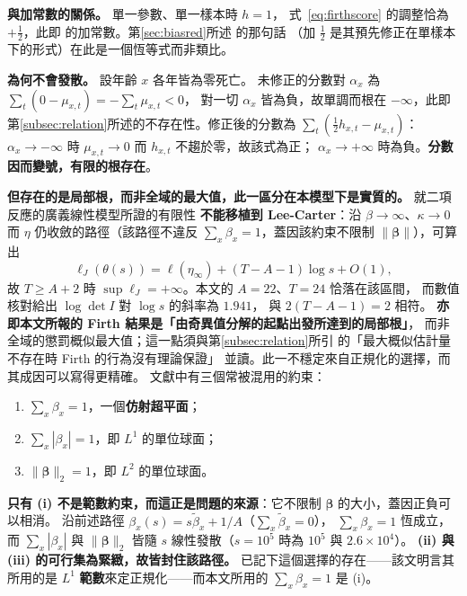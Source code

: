 \documentclass[UTF8, fontset=macnew, a4paper, 12pt]{ctexart}
\begin{document}
\textbf{與加常數的關係。} 單一參數、單一樣本時 $h=1$，
式~\eqref{eq:firthscore} 的調整恰為 $+\tfrac12$，此即 \citet{haldane1956}
的加常數。第\ref{sec:biasred}所述 \citet[\S3.3]{firth1993} 的那句話
（加 $\tfrac12$ 是其預先修正在單樣本下的形式）在此是一個恆等式而非類比。

\textbf{為何不會發散。} 設年齡 $x$ 各年皆為零死亡。
未修正的分數對 $\alpha_x$ 為 $\sum_t(0-\mu_{x,t})=-\sum_t\mu_{x,t}<0$，
對一切 $\alpha_x$ 皆為負，故單調而根在 $-\infty$，此即
第\ref{subsec:relation}所述的不存在性。修正後的分數為
$\sum_t(\tfrac12 h_{x,t}-\mu_{x,t})$：$\alpha_x\to-\infty$ 時
$\mu_{x,t}\to0$ 而 $h_{x,t}$ 不趨於零，故該式為正；
$\alpha_x\to+\infty$ 時為負。\textbf{分數因而變號，有限的根存在}。

\textbf{但存在的是局部根，而非全域的最大值，此一區分在本模型下是實質的。}
\citet{kosmidis2021} 就二項反應的廣義線性模型所證的有限性
\textbf{不能移植到 Lee-Carter}：沿 $\beta\to\infty$、$\kappa\to0$ 而
$\eta$ 仍收斂的路徑（該路徑不違反 $\sum_x\beta_x=1$，蓋因該約束不限制
$\|\boldsymbol\beta\|$），可算出
$$\ell_J(\theta(s))=\ell(\eta_\infty)+(T-A-1)\log s+O(1),$$
故 $T\ge A+2$ 時 $\sup\ell_J=+\infty$。本文的 $A=22$、$T=24$ 恰落在該區間，
而數值核對給出 $\log\det I$ 對 $\log s$ 的斜率為 $1.941$，
與 $2(T-A-1)=2$ 相符。
\textbf{亦即本文所報的 Firth 結果是「由奇異值分解的起點出發所達到的局部根」}，
而非全域的懲罰概似最大值；這一點須與第\ref{subsec:relation}所引
\citet{lewis2024} 的「最大概似估計量不存在時 Firth 的行為沒有理論保證」
並讀。此一不穩定來自正規化的選擇，而其成因可以寫得更精確。
文獻中有三個常被混用的約束：

\begin{enumerate}[label=(\roman*)]
\item $\sum_x\beta_x=1$，一個\textbf{仿射超平面}；
\item $\sum_x|\beta_x|=1$，即 $L^1$ 的單位球面；
\item $\|\boldsymbol\beta\|_2=1$，即 $L^2$ 的單位球面。
\end{enumerate}

\textbf{只有 (i) 不是範數約束，而這正是問題的來源}：它不限制
$\boldsymbol\beta$ 的大小，蓋因正負可以相消。
沿前述路徑 $\beta_x(s)=s\tilde\beta_x+1/A$（$\sum_x\tilde\beta_x=0$），
$\sum_x\beta_x=1$ 恆成立，而 $\sum_x|\beta_x|$ 與 $\|\boldsymbol\beta\|_2$
皆隨 $s$ 線性發散（$s=10^5$ 時為 $10^5$ 與 $2.6\times10^4$）。
\textbf{(ii) 與 (iii) 的可行集為緊緻，故皆封住該路徑。}
\citet[\S2 註 4]{hunt2020} 已記下這個選擇的存在——該文明言其所用的是
$L^1$ \textbf{範數}來定正規化——而本文所用的 $\sum_x\beta_x=1$ 是 (i)。
\end{document}
